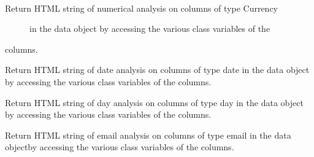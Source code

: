 \documentclass[letterpaper,10pt,english]{sphinxmanual}
\begin{document}
\begin{fulllineitems}
\begin{fulllineitems}
\end{fulllineitems}


\begin{fulllineitems}
\label{Code_rst/rep:report.Report.currency_analysis}~\begin{description}
\item[{Return HTML string of numerical analysis on columns of type Currency}] \leavevmode
in the data object by accessing the various class variables of the

\end{description}

columns.

\end{fulllineitems}


\begin{fulllineitems}
\label{Code_rst/rep:report.Report.date_analysis}
Return HTML string of date analysis on columns of type date 
in the data object by accessing the various class variables of the
columns.

\end{fulllineitems}


\begin{fulllineitems}
\label{Code_rst/rep:report.Report.day_analysis}
Return HTML string of day analysis on columns of type day 
in the data object by accessing the various class variables of the
columns.

\end{fulllineitems}


\begin{fulllineitems}
\label{Code_rst/rep:report.Report.email_analysis}
Return HTML string of email analysis on columns of type email
in the data objectby accessing the various class variables of the
columns.

\end{fulllineitems}



\end{fulllineitems}
\end{document}
